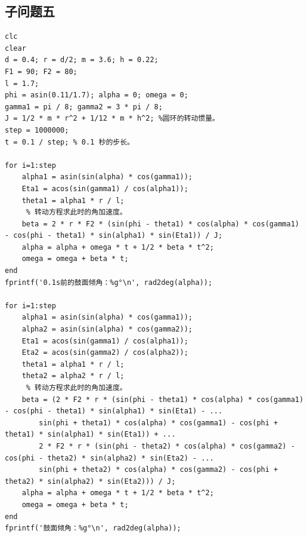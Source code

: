 \documentclass{cumcm}
\begin{document}
\subsection{子问题五}
\begin{lstlisting}
clc
clear
d = 0.4; r = d/2; m = 3.6; h = 0.22;
F1 = 90; F2 = 80;
l = 1.7;
phi = asin(0.11/1.7); alpha = 0; omega = 0;
gamma1 = pi / 8; gamma2 = 3 * pi / 8;
J = 1/2 * m * r^2 + 1/12 * m * h^2; %圆环的转动惯量。
step = 1000000;
t = 0.1 / step; % 0.1 秒的步长。

for i=1:step
    alpha1 = asin(sin(alpha) * cos(gamma1));
    Eta1 = acos(sin(gamma1) / cos(alpha1));
    theta1 = alpha1 * r / l;
     % 转动方程求此时的角加速度。
    beta = 2 * r * F2 * (sin(phi - theta1) * cos(alpha) * cos(gamma1) - cos(phi - theta1) * sin(alpha1) * sin(Eta1)) / J;
    alpha = alpha + omega * t + 1/2 * beta * t^2;
    omega = omega + beta * t;
end
fprintf('0.1s前的鼓面倾角：%g°\n', rad2deg(alpha));

for i=1:step
    alpha1 = asin(sin(alpha) * cos(gamma1));
    alpha2 = asin(sin(alpha) * cos(gamma2));
    Eta1 = acos(sin(gamma1) / cos(alpha1));
    Eta2 = acos(sin(gamma2) / cos(alpha2));
    theta1 = alpha1 * r / l;
    theta2 = alpha2 * r / l;
     % 转动方程求此时的角加速度。
    beta = (2 * F2 * r * (sin(phi - theta1) * cos(alpha) * cos(gamma1) - cos(phi - theta1) * sin(alpha1) * sin(Eta1) - ...
        sin(phi + theta1) * cos(alpha) * cos(gamma1) - cos(phi + theta1) * sin(alpha1) * sin(Eta1)) + ...
        2 * F2 * r * (sin(phi - theta2) * cos(alpha) * cos(gamma2) - cos(phi - theta2) * sin(alpha2) * sin(Eta2) - ...
        sin(phi + theta2) * cos(alpha) * cos(gamma2) - cos(phi + theta2) * sin(alpha2) * sin(Eta2))) / J;
    alpha = alpha + omega * t + 1/2 * beta * t^2;
    omega = omega + beta * t;
end
fprintf('鼓面倾角：%g°\n', rad2deg(alpha));
\end{lstlisting}
\end{document}

